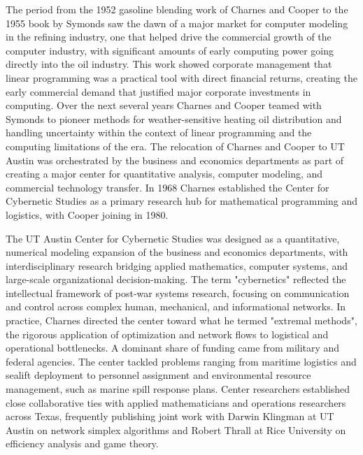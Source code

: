 The period from the 1952 gasoline blending work of Charnes and Cooper to the 1955 book by Symonds saw the dawn of a major market for computer modeling in the refining industry, one that helped drive the commercial growth of the computer industry, with significant amounts of early computing power going directly into the oil industry. This work showed corporate management that linear programming was a practical tool with direct financial returns, creating the early commercial demand that justified major corporate investments in computing. Over the next several years Charnes and Cooper teamed with Symonds to pioneer methods for weather-sensitive heating oil distribution and handling uncertainty within the context of linear programming and the computing limitations of the era. The relocation of Charnes and Cooper to UT Austin was orchestrated by the business and economics departments as part of creating a major center for quantitative analysis, computer modeling, and commercial technology transfer. In 1968 Charnes established the Center for Cybernetic Studies as a primary research hub for mathematical programming and logistics, with Cooper joining in 1980. \cite{cooperBriefHistoryLong2002}

The UT Austin Center for Cybernetic Studies was designed as a quantitative, numerical modeling expansion of the business and economics departments, with interdisciplinary research bridging applied mathematics, computer systems, and large-scale organizational decision-making. The term "cybernetics" reflected the intellectual framework of post-war systems research, focusing on communication and control across complex human, mechanical, and informational networks. In practice, Charnes directed the center toward what he termed "extremal methods", the rigorous application of optimization and network flows to logistical and operational bottlenecks. A dominant share of funding came from military and federal agencies. The center tackled problems ranging from maritime logistics and sealift deployment to personnel assignment and environmental resource management, such as marine spill response plans. Center researchers established close collaborative ties with applied mathematicians and operations researchers across Texas, frequently publishing joint work with Darwin Klingman at UT Austin on network simplex algorithms and Robert Thrall at Rice University on efficiency analysis and game theory.

